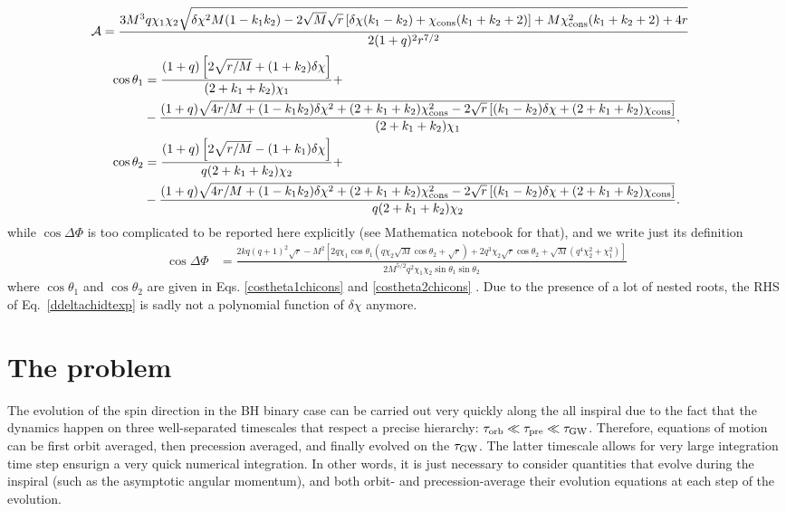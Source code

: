 \documentclass[floats,floatfix,showpacs,amssymb,prd,twocolumn,superscriptaddress,nofootinbib,nolongbibliography,reprint,onecolumn]{revtex4-2}
\newcommand{\deltachi}{\delta \chi}
\newcommand{\chicons}{\chi_{\rm cons}}
\begin{document}
\begin{align}
 \mathcal{A} &= \frac{3 M^3 q \chi_1 \chi_2 \sqrt{\delta \chi ^2 M (1-k_1 k_2)-2 \sqrt{M} \sqrt{r} \left[\delta \chi  (k_1-k_2)+\chicons (k_1+k_2+2)\right]+M \chicons^2 (k_1+k_2+2)+4 r}}{2 (1+q)^2 r^{7/2}}
\end{align} 
\begin{align}\label{costheta1chicons}
\cos\theta_{1} &=\frac{(1+q) \left[2 \sqrt{r/M} +(1+k_2) \delta \chi \right] }{{(2+k_1+k_2) \chi_1}} + \notag \\ &
-\frac{ (1+q) \sqrt{4 r/M+ (1-k_1 k_2) \delta \chi^2+(2+k_1+ k_2) \chicons^2 -2 \sqrt{r} \left[ (k_1-k_2) \delta\chi+(2+k_1+k_2)\chicons \right] }}{(2+k_1+k_2) \chi_1},\\
\label{costheta2chicons}
\cos\theta_{2} &=\frac{(1+q) \left[2 \sqrt{r/M} -(1+k_1) \delta \chi \right] }{{q (2+k_1+k_2) \chi_2}} + \notag \\ &
-\frac{ (1+q) \sqrt{4 r/M+ (1-k_1 k_2) \delta \chi^2+(2+k_1+ k_2) \chicons^2 -2 \sqrt{r} \left[ (k_1-k_2) \delta\chi+(2+k_1+k_2)\chicons \right] }}{ q (2+k_1+k_2) \chi_2}.
\end{align} 
while  $\cos \Delta \Phi$ is too complicated to be reported here explicitly (see Mathematica notebook for that), and we write just its definition
\begin{align}
\cos \Delta \Phi&=\frac{2 k q (q+1)^2 \sqrt{r}-M^2 \left[2  q \chi_1 \cos \theta_1  \left( q \chi_2 \sqrt{M} \cos \theta_2+\sqrt{r}\right)+2  q^3  \chi_2 \sqrt{r} \cos \theta_2+\sqrt{M} \left(q^4 \chi_2^2+\chi_1^2\right)\right]}{2 M^{5/2} q^2 \chi_1 \chi_2 \sin \theta_1 \sin \theta_2 }
\end{align} 
where $\cos\theta_{1} $ and $\cos\theta_{2} $ are given in Eqs. \eqref{costheta1chicons} and \eqref{costheta2chicons} .
Due to the presence of a lot of nested roots, the RHS of Eq.~\eqref{ddeltachidtexp} is sadly not a polynomial function of $\deltachi$ anymore.
\section{The problem}

The evolution of the spin direction in the BH binary case can be carried out very quickly along the all inspiral due to the fact that the dynamics happen on three well-separated timescales that respect a precise hierarchy: $\tau_{\rm orb} \ll \tau_{\rm pre} \ll \tau_{\rm GW}$. Therefore, equations of motion can be first orbit averaged, then precession averaged, and finally evolved on the $ \tau_{\rm GW}$. The latter timescale allows for very large integration time step ensurign a very quick numerical integration. 
In other words, it is just necessary to consider quantities that evolve during the inspiral (such as the asymptotic angular momentum), and both orbit- and precession-average their evolution equations at each step of the evolution. 
\end{document}
